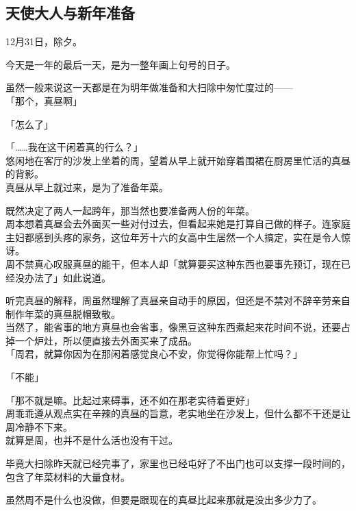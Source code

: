 \subsection{天使大人与新年准备}

12月31日，除夕。

今天是一年的最后一天，是为一整年画上句号的日子。

虽然一般来说这一天都是在为明年做准备和大扫除中匆忙度过的——\\

「那个，真昼啊」

「怎么了」

「……我在这干闲着真的行么？」\\

悠闲地在客厅的沙发上坐着的周，望着从早上就开始穿着围裙在厨房里忙活的真昼的背影。\\

真昼从早上就过来，是为了准备年菜。

既然决定了两人一起跨年，那当然也要准备两人份的年菜。\\

周本想着真昼会去外面买一些对付过去，但看起来她是打算自己做的样子。连家庭主妇都感到头疼的家务，这位年芳十六的女高中生居然一个人搞定，实在是令人惊讶。\\

周不禁真心叹服真昼的能干，但本人却「就算要买这种东西也要事先预订，现在已经没办法了」如此说道。

听完真昼的解释，周虽然理解了真昼亲自动手的原因，但还是不禁对不辞辛劳亲自制作年菜的真昼脱帽致敬。\\

当然了，能省事的地方真昼也会省事，像黑豆这种东西煮起来花时间不说，还要占掉一个炉灶，所以便直接去外面买来了成品。\\

「周君，就算你因为在那闲着感觉良心不安，你觉得你能帮上忙吗？」

「不能」

「那不就是嘛。比起过来碍事，还不如在那老实待着更好」\\

周乖乖遵从观点实在辛辣的真昼的旨意，老实地坐在沙发上，但什么都不干还是让周冷静不下来。\\

就算是周，也并不是什么活也没有干过。

毕竟大扫除昨天就已经完事了，家里也已经屯好了不出门也可以支撑一段时间的，包含了年菜材料的大量食材。

虽然周不是什么也没做，但要是跟现在的真昼比起来那就是没出多少力了。\\

